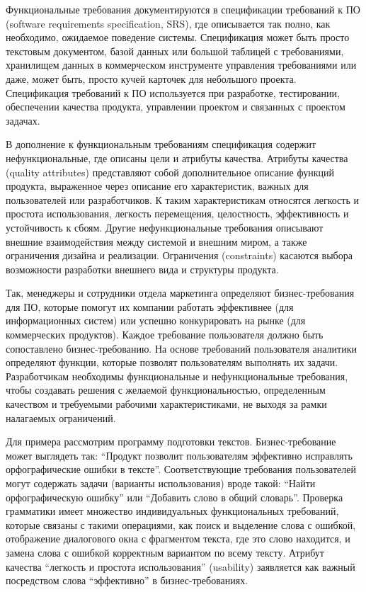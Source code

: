 \documentclass{../../text-style}
\begin{document}
Функциональные требования документируются в спецификации требований к ПО (software requirements specification, SRS), где описывается так полно, как необходимо, ожидаемое поведение системы.
Спецификация может быть просто текстовым документом, базой данных или большой таблицей с требованиями, хранилищем данных в коммерческом инструменте управления требованиями или даже, может быть, просто кучей карточек для небольшого проекта.
Спецификация требований к ПО используется при разработке, тестировании, обеспечении качества продукта, управлении проектом и связанных с проектом задачах.

В дополнение к функциональным требованиям спецификация содержит нефункциональные, где описаны цели и атрибуты качества.
Атрибуты качества (quality attributes) представляют собой дополнительное описание функций продукта, выраженное через описание его характеристик, важных для пользователей или разработчиков.
К таким характеристикам относятся легкость и простота использования, легкость перемещения, целостность, эффективность и устойчивость к сбоям.
Другие нефункциональные требования описывают внешние взаимодействия между системой и внешним миром, а также ограничения дизайна и реализации.
Ограничения (constraints) касаются выбора возможности разработки внешнего вида и структуры продукта.

Так, менеджеры и сотрудники отдела маркетинга определяют бизнес-требования для ПО, которые помогут их компании работать эффективнее (для информационных систем) или успешно конкурировать на рынке (для коммерческих продуктов).
Каждое требование пользователя должно быть сопоставлено бизнес-требованию.
На основе требований пользователя аналитики определяют функции, которые позволят пользователям выполнять их задачи.
Разработчикам необходимы функциональные и нефункциональные требования, чтобы создавать решения с желаемой функциональностью, определенным качеством и требуемыми рабочими характеристиками, не выходя за рамки налагаемых ограничений.

Для примера рассмотрим программу подготовки текстов.
Бизнес-требование может выглядеть так: \enquote{Продукт позволит пользователям эффективно исправлять орфографические ошибки в тексте}.
Соответствующие требования пользователей могут содержать задачи (варианты использования) вроде такой: \enquote{Найти орфографическую ошибку} или \enquote{Добавить слово в общий словарь}.
Проверка грамматики имеет множество индивидуальных функциональных требований, которые связаны с такими операциями, как поиск и выделение слова с ошибкой, отображение диалогового окна с фрагментом текста, где это слово находится, и замена слова с ошибкой корректным вариантом по всему тексту.
Атрибут качества \enquote{легкость и простота использования} (usability) заявляется как важный посредством слова \enquote{эффективно} в бизнес-требованиях.
\end{document}
